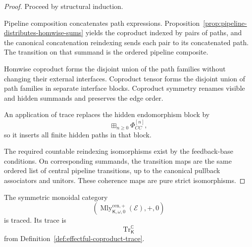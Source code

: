 \begin{proof}
Proceed by structural induction.

Pipeline composition concatenates path expressions.
Proposition~\ref{prop:pipeline-distributes-homwise-sums} yields the coproduct
indexed by pairs of paths, and the canonical concatenation reindexing sends
each pair to its concatenated path.  The transition on that summand is the
ordered pipeline composite.

Homwise coproduct forms the disjoint union of the path families without
changing their external interfaces.  Coproduct tensor forms the disjoint
union of path families in separate interface blocks.  Coproduct symmetry
renames visible and hidden summands and preserves the edge order.

An application of trace replaces the hidden endomorphism block by
\[
    \boxplus_{n\geq0}\Phi_{CC}^{[n]},
\]
so it inserts all finite hidden paths in that block.

The required countable reindexing isomorphisms exist by the feedback-base
conditions.  On corresponding summands, the transition maps are the same
ordered list of central pipeline transitions, up to the canonical pullback
associators and unitors.  These coherence maps are pure strict
isomorphisms.
\end{proof}

\begin{theorem}
\label{thm:effectful-traced-mealy-category}
The symmetric monoidal category
\[
    \left(
        \operatorname{Mly}^{\mathrm{cen},+}_{\mathsf K,\omega,0}
        (\mathcal E),
        +,
        0
    \right)
\]
is traced.  Its trace is
\[
    \operatorname{Tr}^{\mathbb C}_{\mathsf K}
\]
from Definition~\ref{def:effectful-coproduct-trace}.
\end{theorem}

